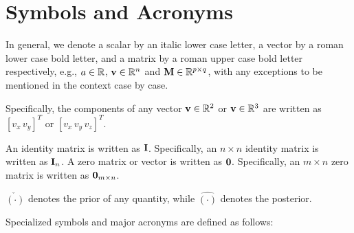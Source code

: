 \chapter*{Symbols and Acronyms}

In general, we denote a scalar by an italic lower case letter,
a vector by a roman lower case bold letter,
and a matrix by a roman upper case bold letter respectively, e.g.,
$a \in \mathbb{R}$, $\mathbf{v} \in \mathbb{R}^n$ and $\mathbf{M} \in \mathbb{R}^{p \times q}$, with any exceptions to be mentioned in the context case by case.

Specifically, the components of any vector ${\bf v} \in \mathbb{R}^2$ or ${\bf v}\in \mathbb{R}^3$ are written as $[v_x\,v_y]^T$ or $[v_x\,v_y\,v_z]^T$.

An identity matrix is written as $\mathbf{I}$. Specifically, an $n\times n$ identity matrix is written as $\mathbf{I}_n$.
A zero matrix or vector is written as ${\bf 0}$. Specifically, an $m\times n$ zero matrix is written as ${\bf 0}_{m\times n}$.

$\check{(\cdot)}$ denotes the prior of any quantity, while $\hat{(\cdot)}$ denotes the posterior.

Specialized symbols and major acronyms are defined as follows:

\newpage

